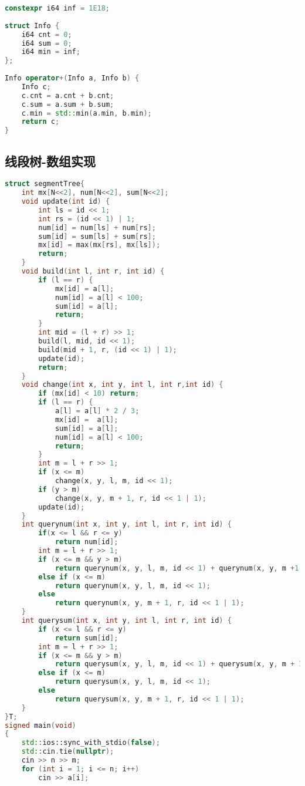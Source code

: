 \begin{lstlisting}[language=c++]
constexpr i64 inf = 1E18;
 
struct Info {
    i64 cnt = 0;
    i64 sum = 0;
    i64 min = inf;
};
 
Info operator+(Info a, Info b) {
    Info c;
    c.cnt = a.cnt + b.cnt;
    c.sum = a.sum + b.sum;
    c.min = std::min(a.min, b.min);
    return c;
}
\end{lstlisting}

\subsection{线段树-数组实现}
\begin{lstlisting}[language=c++]
struct segmentTree{
    int mx[N<<2], num[N<<2], sum[N<<2];
    void update(int id) {
        int ls = id << 1;
        int rs = (id << 1) | 1;
        num[id] = num[ls] + num[rs];
        sum[id] = sum[ls] + sum[rs];
        mx[id] = max(mx[rs], mx[ls]);
        return;
    }
    void build(int l, int r, int id) {
        if (l == r) {
            mx[id] = a[l];
            num[id] = a[l] < 100;
            sum[id] = a[l];
            return;
        }
        int mid = (l + r) >> 1;
        build(l, mid, id << 1);
        build(mid + 1, r, (id << 1) | 1);
        update(id);
        return;
    }
    void change(int x, int y, int l, int r,int id) {
        if (mx[id] < 10) return;
        if (l == r) {
            a[l] = a[l] * 2 / 3;
            mx[id] =  a[l];
            sum[id] = a[l];
            num[id] = a[l] < 100;
            return;
        }
        int m = l + r >> 1;
        if (x <= m) 
            change(x, y, l, m, id << 1);
        if (y > m)
            change(x, y, m + 1, r, id << 1 | 1);
        update(id);
    }
    int querynum(int x, int y, int l, int r, int id) {
        if(x <= l && r <= y) 
            return num[id];
        int m = l + r >> 1;
        if (x <= m && y > m)
            return querynum(x, y, l, m, id << 1) + querynum(x, y, m +1, r, id << 1 | 1);
        else if (x <= m)
            return querynum(x, y, l, m, id << 1);
        else
            return querynum(x, y, m + 1, r, id << 1 | 1);
    }
    int querysum(int x, int y, int l, int r, int id) {
        if (x <= l && r <= y)
            return sum[id];
        int m = l + r >> 1;
        if (x <= m && y > m) 
            return querysum(x, y, l, m, id << 1) + querysum(x, y, m + 1, r, id << 1 | 1);
        else if (x <= m)
            return querysum(x, y, l, m, id << 1);
        else
            return querysum(x, y, m + 1, r, id << 1 | 1);
    }
}T;
signed main(void)
{
    std::ios::sync_with_stdio(false);
    std::cin.tie(nullptr);
    cin >> n >> m;
    for (int i = 1; i <= n; i++)
        cin >> a[i];


\end{lstlisting}
